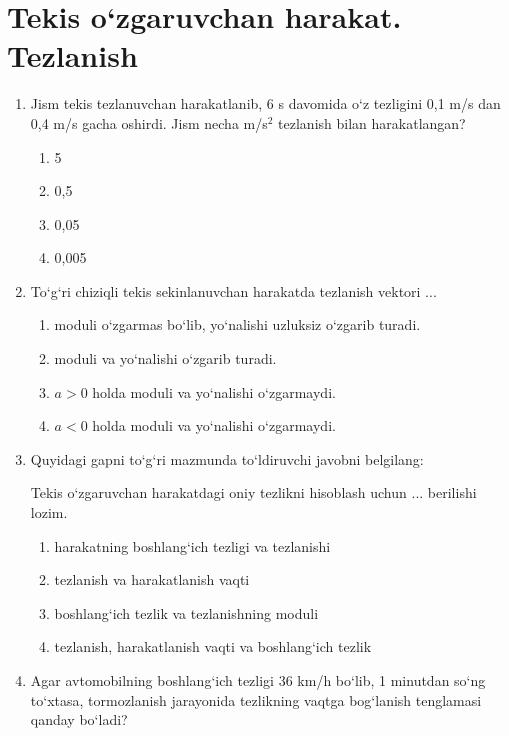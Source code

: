 \section{Tekis o‘zgaruvchan harakat. Tezlanish}

\begin{enumerate}

\item Jism tekis tezlanuvchan harakatlanib, 6 s davomida o‘z tezligini 0,1 m/s dan 0,4 m/s gacha oshirdi. 
Jism necha m/s$^2$ tezlanish bilan harakatlangan?

\begin{enumerate}[label=\Alph*)]
\item 5
\item 0,5
\item 0,05
\item 0,005
\end{enumerate}

\item To‘g‘ri chiziqli tekis sekinlanuvchan harakatda tezlanish vektori ... 

\begin{enumerate}[label=\Alph*)]
\item moduli o‘zgarmas bo‘lib, yo‘nalishi uzluksiz o‘zgarib turadi.
\item moduli va yo‘nalishi o‘zgarib turadi.
\item  $a>0$ holda moduli va yo‘nalishi o‘zgarmaydi. 
\item  $a<0$ holda moduli va yo‘nalishi o‘zgarmaydi.
\end{enumerate}

\item Quyidagi gapni to‘g‘ri mazmunda to‘ldiruvchi javobni belgilang:

Tekis o‘zgaruvchan harakatdagi oniy tezlikni hisoblash uchun ... berilishi lozim.

\begin{enumerate}[label=\Alph*)]
\item harakatning boshlang‘ich tezligi va tezlanishi
\item tezlanish va harakatlanish vaqti
\item boshlang‘ich tezlik va tezlanishning moduli
\item tezlanish, harakatlanish vaqti va boshlang‘ich tezlik
\end{enumerate}

\item Agar avtomobilning boshlang‘ich tezligi 36 km/h bo‘lib, 1 minutdan so‘ng to‘xtasa, tormozlanish jarayonida tezlikning vaqtga bog‘lanish tenglamasi qanday bo‘ladi?


\end{enumerate}
